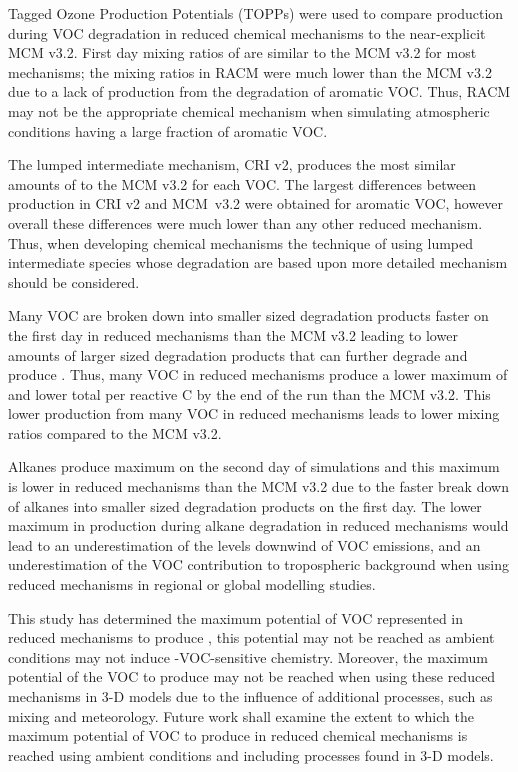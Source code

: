 Tagged Ozone Production Potentials (TOPPs) were used to compare  production during VOC degradation in reduced chemical mechanisms to the near-explicit MCM v3.2. 
First day mixing ratios of  are similar to the MCM v3.2 for most mechanisms; the  mixing ratios in RACM were much lower than the MCM v3.2 due to a lack of  production from the degradation of aromatic VOC.
Thus, RACM may not be the appropriate chemical mechanism when simulating atmospheric conditions having a large fraction of aromatic VOC.

The lumped intermediate mechanism, CRI v2, produces the most similar amounts of  to the MCM v3.2 for each VOC.
The largest differences between  production in CRI v2 and \mbox{MCM v3.2} were obtained for aromatic VOC, however overall these differences were much lower than any other reduced mechanism.
Thus, when developing chemical mechanisms the technique of using lumped intermediate species whose degradation are based upon more detailed mechanism should be considered.

Many VOC are broken down into smaller sized degradation products faster on the first day in reduced mechanisms than the MCM v3.2 leading to lower amounts of larger sized degradation products that can further degrade and produce .
Thus, many VOC in reduced mechanisms produce a lower maximum of  and lower total  per reactive C by the end of the run than the MCM v3.2.
This lower  production from many VOC in reduced mechanisms leads to lower  mixing ratios compared to the MCM v3.2.

Alkanes produce maximum  on the second day of simulations and this maximum is lower in reduced mechanisms than the MCM v3.2 due to the faster break down of alkanes into smaller sized degradation products on the first day.
The lower maximum in  production during alkane degradation in reduced mechanisms would lead to an underestimation of the  levels downwind of VOC emissions, and an underestimation of the VOC contribution to tropospheric background  when using reduced mechanisms in regional or global modelling studies.

This study has determined the maximum potential of VOC represented in reduced mechanisms to produce , this potential may not be reached as ambient  conditions may not induce -VOC-sensitive chemistry.
Moreover, the maximum potential of the VOC to produce  may not be reached when using these reduced mechanisms in 3-D models due to the influence of additional processes, such as mixing and meteorology.
Future work shall examine the extent to which the maximum potential of VOC to produce  in reduced chemical mechanisms is reached using ambient  conditions and including processes found in 3-D models.
